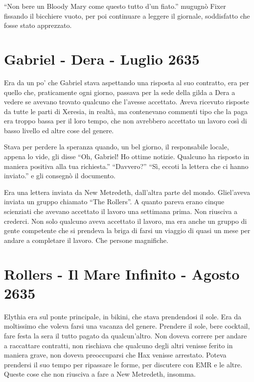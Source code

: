     ``Non bere un Bloody Mary come questo tutto d'un fiato.'' mugugnò
    Fixer fissando il bicchiere vuoto, per poi continuare a leggere il
    giornale, soddisfatto che fosse stato apprezzato.

  \section{Gabriel - Dera - Luglio 2635}

    Era da un po' che Gabriel stava aspettando una risposta al suo
    contratto, era per quello che, praticamente ogni giorno, passava per la
    sede della gilda a Dera a vedere se avevano trovato qualcuno che
    l'avesse accettato. Aveva ricevuto risposte da tutte le parti di
    Xeresia, in realtà, ma contenevano commenti tipo che la paga era troppo bassa per
    il loro tempo, che non avrebbero accettato un lavoro così di basso
    livello ed altre cose del genere.

    Stava per perdere la speranza quando, un bel giorno, il responsabile
    locale, appena lo vide, gli disse ``Oh, Gabriel! Ho ottime notizie.
    Qualcuno ha risposto in maniera positiva alla tua richiesta.''
    ``Davvero?'' ``Sì, eccoti la lettera che ci hanno inviato.'' e gli
    consegnò il documento.

    Era una lettera inviata da New Metredeth, dall'altra parte del mondo.
    Gliel'aveva inviata un gruppo chiamato ``The Rollers''. A quanto pareva
    erano cinque scienziati che avevano accettato il lavoro una settimana
    prima. Non riusciva a crederci. Non solo qualcuno aveva accettato il
    lavoro, ma era anche un gruppo di gente competente che si prendeva la
    briga di farsi un viaggio di quasi un mese per andare a completare il
    lavoro. Che persone magnifiche.

  \section{Rollers - Il Mare Infinito - Agosto 2635}
    
    Elythia era sul ponte principale, in bikini, che stava prendendosi il
    sole. Era da moltissimo che voleva farsi una vacanza del genere.
    Prendere il sole, bere cocktail, fare festa la sera il tutto pagato da
    qualcun'altro. Non doveva correre per andare a raccattare contratti,
    non rischiava che qualcuno degli altri venisse ferito in maniera grave,
    non doveva preoccuparsi che Hax venisse arrestato. Poteva prendersi il
    suo tempo per ripassare le forme, per discutere con EMR e le altre.
    Queste cose che non riusciva a fare a New Metredeth, insomma.

